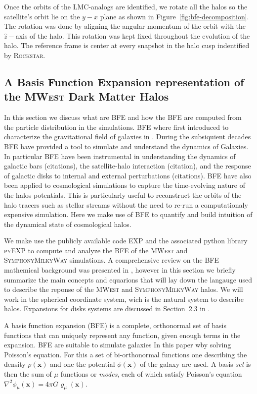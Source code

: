 \documentclass[twocolumn, linenumbers]{openjournal}
\newcommand{\mwest}{\textsc{MWest }}
\newcommand{\symphony}{\textsc{SymphonyMilkyWay }}
\newcommand{\expcode}{\textsc{EXP }}
\begin{document}
Once the orbits of the LMC-analogs are identified, we rotate all the halos so the satellite's orbit lie 
on the $y-x$ plane as shown in Figure~\ref{fig:bfe-decomposition}. The rotation was done by aligning the 
angular momentum of the orbit with the $\hat{z}-$axis of the halo. This rotation was kept fixed throughout 
the evolution of the halo. The reference frame is center at every snapshot in the halo cusp indentified by 
\textsc{Rockstar}. 

\subsection{A Basis Function Expansion representation of the \mwest Dark Matter Halos}\label{sec:bfe}

In this section we discuss what are BFE and how the BFE are computed from the particle distribution 
in the simulations. BFE where first introduced to characterize the gravitational field of galaxies 
in \cite{Clutton-Brock72}. During the subsiquient decades BFE have provided a tool 
to simulate and understand the dynamics of Galaxies. In particular BFE have been instrumental
in understanding the dynamics of galactic bars (citations), the satellite-halo interaction (citation),
and the response of galactic disks to internal and external perturbations (citations).
BFE have also been applied to cosmological simulations to capture the time-evolving nature
of the halos potentials. This is particularly useful to reconstruct the orbits of the halo tracers
\citep{Lowing11, Sanders20} such as stellar streams \citep{Arora24} without the need to re-run a computationaly 
expensive simulation. Here we make use of BFE to quantify and build intuition of the 
dynamical state of cosmological halos.  

We make use the publicly available code \expcode and the associated python library 
\textsc{pyEXP} to compute and analyze the BFE of the \mwest and \symphony simulations.    
A comprehensive review on the BFE mathemical background was presented in \cite{EXP}, however 
in this section we briefly summarize the main concepts and equarions that will lay down the 
langauge used to describe the reponse of the \mwest and \symphony halos. We will work in 
the spherical coordinate system, wich is the natural system to describe halos. 
Expansions for disks systems are discussed in Section~2.3 in \cite{EXP}.

A basis function expansion (BFE) is a complete, orthonormal set of basis functions that 
can uniquely represent any function, given enough terms in the expansion. 
BFE are suitable to simulate galaxies In this paper wby solving Poisson's equation. For this
a set of bi-orthonormal functions one describing the density $\rho(\textbf{x})$ and 
one the potential $\phi(\textbf{x})$ of the galaxy are used. A basis \textit{set}
is then the sum of $\mu$ functions or \textit{modes}, each of which satisfy
Poisson's equation $\nabla^{2}\phi_{\mu}(\textbf{x}) = 4\pi G\varrho_{\mu}(\textbf{x})$. 
\end{document}
